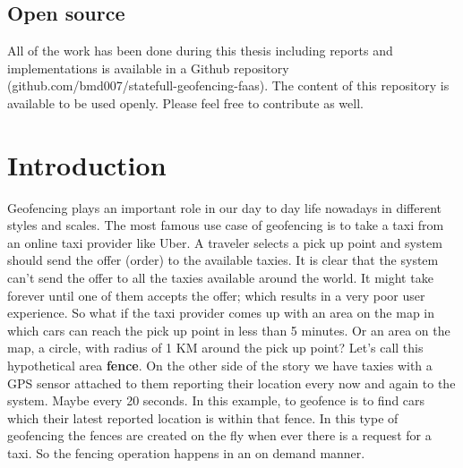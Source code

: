 \documentclass[a4]{report}
\begin{document}
    \section*{Open source}
    All of the work has been done during this thesis including reports and implementations is available in
    a Github repository (github.com/bmd007/statefull-geofencing-faas).
    The content of this repository is available to be used openly.
    Please feel free to contribute as well.

    \newpage

    \tableofcontents

    \listoffigures

    \listoftables

    \newpage


    \chapter{Introduction}
    Geofencing\cite{geofencing} plays an important role in our day to day life nowadays in different styles and scales.
    The most famous use case of geofencing is to take a taxi\cite{taxi-geofencing} from an online taxi provider like Uber.
    A traveler selects a pick up point and system should send the offer (order) to the available taxies.
    It is clear that the system can't send the offer to all the taxies available around the world.
    It might take forever until one of them accepts the offer;
    which results in a very poor user experience.
    So what if the taxi provider comes up with an area on the map in which cars can reach the pick up point in less
    than 5 minutes.
    Or an area on the map, a circle, with radius of 1 KM around the pick up point?
    Let's call this hypothetical area \textbf{fence}.
    On the other side of the story we have taxies with a GPS sensor attached to them reporting their location every
    now and again to the system.
    Maybe every 20 seconds.
    In this example, to geofence is to find cars which their latest reported location is within that fence.
    In this type of geofencing the fences are created on the fly when ever there is a request for a taxi.
    So the fencing operation happens in an on demand manner.
\end{document}

